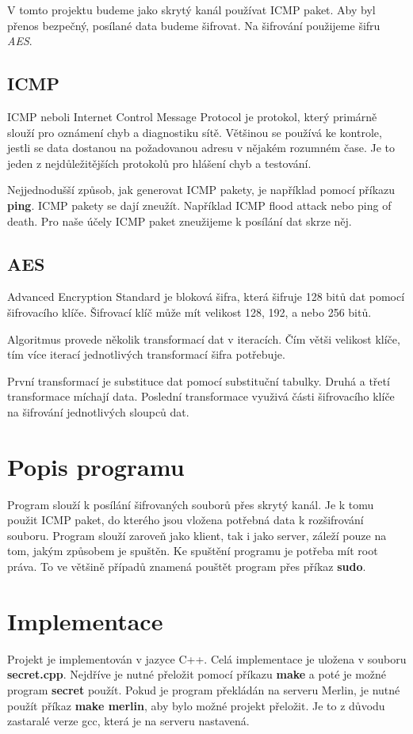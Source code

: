 \documentclass[11pt, a4paper]{article}
\begin{document}
V tomto projektu budeme jako skrytý kanál používat ICMP paket. Aby byl přenos bezpečný, posílané data budeme šifrovat. Na šifrování použijeme šifru \emph{AES}.

\subsection{ICMP}
ICMP neboli Internet Control Message Protocol je protokol, který primárně slouží pro oznámení chyb a diagnostiku sítě. Většinou se používá ke kontrole, jestli se data dostanou na požadovanou adresu v nějakém rozumném čase. Je to jeden z nejdůležitějších protokolů pro hlášení chyb a testování.

Nejjednodušší způsob, jak generovat ICMP pakety, je například pomocí příkazu \textbf{ping}. 
ICMP pakety se dají zneužít. Například ICMP flood attack nebo ping of death. Pro naše účely ICMP paket zneužijeme k posílání dat skrze něj.

\subsection{AES}
Advanced Encryption Standard je bloková šifra, která šifruje 128 bitů dat pomocí šifrovacího klíče. Šifrovací klíč může mít velikost 128, 192, a nebo 256 bitů. 

Algoritmus provede několik transformací dat v iteracích. Čím větši velikost klíče, tím více iterací jednotlivých transformací šifra potřebuje. 

První transformací je substituce dat pomocí substituční tabulky. Druhá a třetí transformace míchají data. Poslední transformace využivá části šifrovacího klíče na šifrování jednotlivých sloupců dat. 


\section{Popis programu}
Program slouží k posílání šifrovaných souborů přes skrytý kanál. Je k tomu použit ICMP paket, do kterého jsou vložena potřebná data k rozšifrování souboru. Program slouží zaroveň jako klient, tak i jako server, záleží pouze na tom, jakým způsobem je spuštěn. Ke spuštění programu je potřeba mít root práva. To ve většině případů znamená pouštět program přes příkaz \textbf{sudo}.


\section{Implementace}
Projekt je implementován v jazyce C++. Celá implementace je uložena  v souboru \textbf{secret.cpp}.
Nejdříve je nutné přeložit pomocí příkazu \textbf{make} a poté je možné program \textbf{secret} použít. Pokud je program překládán na serveru Merlin, je nutné použít příkaz \textbf{make merlin}, aby bylo možné projekt přeložit. Je to z důvodu zastaralé verze gcc, která je na serveru nastavená.
\end{document}
